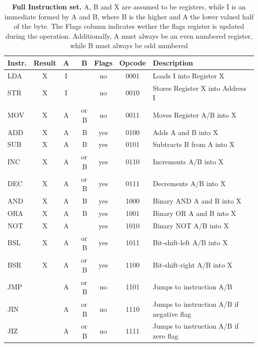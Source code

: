 \begin{table}[ht]{\small
    \caption[Full Instruction Set]{\textbf{Full Instruction set.} A, B and X are assumed to be registers, while I is an immediate formed by A and B, where B is the higher and A the lower valued half of the byte. The Flags column indicates wether the flags register is updated during the operation. Additionally, A must always be an even numbered register, while B must always be odd numbered}
    \label{tab::InstructionSet}
    \begin{tabular}{|l|c|c|r|c|c|l|}\hline
        Instr. & Result & A & B & Flags & Opcode & Description\\ \hline \hline
        LDA & X & I &      & no  & 0001 & Loads I into Register X\\ \hline
        STR & X & I &      & no  & 0010 & Stores Register X into Address I\\ \hline
        MOV & X & A & or B & no  & 0011 & Moves Register A/B into X\\ \hline
        ADD & X & A & B    & yes & 0100 & Adds A and B into X\\ \hline
        SUB & X & A & B    & yes & 0101 & Subtracts B from A into X\\ \hline
        INC & X & A & or B & yes & 0110 & Increments A/B into X\\ \hline
        DEC & X & A & or B & yes & 0111 & Decrements A/B into X\\ \hline
        AND & X & A & B    & yes & 1000 & Binary AND A and B into X\\ \hline
        ORA & X & A & B    & yes & 1001 & Binary OR A and B into X\\ \hline
        NOT & X & A &      & yes & 1010 & Binary NOT A/B into X\\ \hline
        BSL & X & A & or B & yes & 1011 & Bit-shift-left A/B into X\\ \hline
        BSR & X & A & or B & yes & 1100 & Bit-shift-right A/B into X\\ \hline
        JMP &   & A & or B & no  & 1101 & Jumps to instruction A/B\\ \hline
        JIN &   & A & or B & no  & 1110 & Jumps to instruction A/B if negative flag\\ \hline
        JIZ &   & A & or B & no  & 1111 & Jumps to instruction A/B if zero flag\\ \hline
    \end{tabular}}
\end{table}

